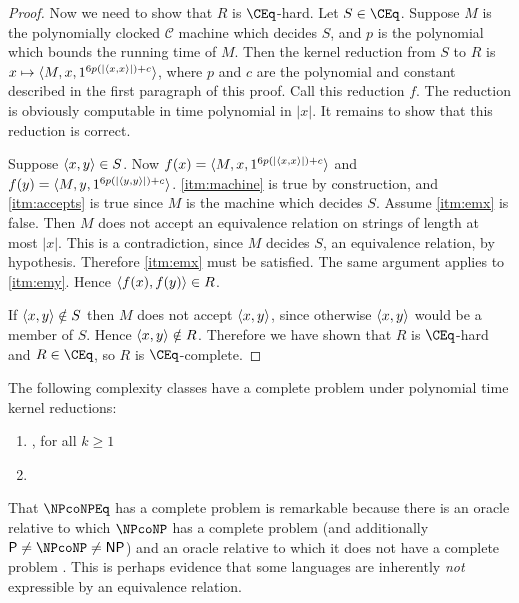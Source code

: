 \begin{proof}
  Now we need to show that $R$ is $\CEq$-hard.
  Let $S\in\CEq$.
  Suppose $M$ is the polynomially clocked $\mathcal{C}$ machine which decides $S$, and $p$ is the polynomial which bounds the running time of $M$.
  Then the kernel reduction from $S$ to $R$ is $x\mapsto\langle M,x,1^{6p(|\langle x,x\rangle|)+c}\rangle$, where $p$ and $c$ are the polynomial and constant described in the first paragraph of this proof.
  Call this reduction $f$.
  The reduction is obviously computable in time polynomial in $|x|$.
  It remains to show that this reduction is correct.

  Suppose $\langle x,y\rangle\in S$.
  Now $f(x)=\langle M,x,1^{6p(|\langle x,x\rangle|)+c}\rangle$ and $f(y)=\langle M,y,1^{6p(|\langle y,y\rangle|)+c}\rangle$.
  \autoref{itm:machine} is true by construction, and \autoref{itm:accepts} is true since $M$ is the machine which decides $S$.
  Assume \autoref{itm:emx} is false.
  Then $M$ does not accept an equivalence relation on strings of length at most $|x|$.
  This is a contradiction, since $M$ decides $S$, an equivalence relation, by hypothesis.
  Therefore \autoref{itm:emx} must be satisfied.
  The same argument applies to \autoref{itm:emy}.
  Hence $\langle f(x),f(y)\rangle\in R$.

  If $\langle x,y\rangle\notin S$ then $M$ does not accept $\langle x,y\rangle$, since otherwise $\langle x,y\rangle$ would be a member of $S$.
  Hence $\langle x,y\rangle\notin R$.  
  Therefore we have shown that $R$ is $\CEq$-hard and $R\in\CEq$, so $R$ is $\CEq$-complete.
\end{proof}

\begin{corollary}\label{cor:completeproblem}
  The following complexity classes have a complete problem under polynomial time kernel reductions:
  \begin{enumerate}
  \item \SKPEq, for all $k\geq 1$
  \item \PSPACEEq
  \end{enumerate}
\end{corollary}

\begin{remark}
  That $\NPcoNPEq$ has a complete problem is remarkable because there is an oracle relative to which $\NPcoNP$ has a complete problem (and additionally $\P\neq\NPcoNP\neq\NP$) \cite{hi} and an oracle relative to which it does not have a complete problem \cite{sipser}.
  This is perhaps evidence that some languages are inherently \emph{not} expressible by an equivalence relation.
\end{remark}

